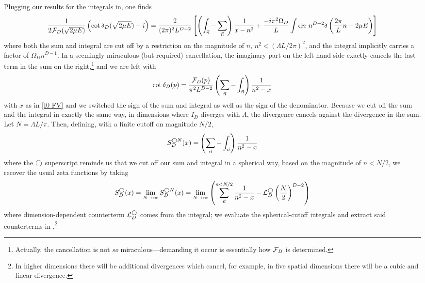 Plugging our results for the integrals in, one finds
\begin{equation}
    \frac{1}{2\mathcal{F}_{D}(\sqrt{2\mu E})}\left(\cot \delta_{D}(\sqrt{2\mu E}) - i\right) = \frac{2}{(2\pi)^2 L^{D-2}}\left[ \left(\int_{\vec{n}} - \sum_{\vec{n}}\right) \frac{1}{x-n^2} + \frac{-i \pi^2\Omega_D}{L} \int \mathrm{d}n\ n^{D-2} \delta\left(\frac{2\pi}{L}n - 2\mu E\right) \right]
\end{equation}
where both the sum and integral are cut off by a restriction on the magnitude of $n$, $n^2 < (\Lambda L / 2\pi)^2$, and the integral implicitly carries a factor of $\Omega_D n^{D-1}$.
In a seemingly miraculous (but required) cancellation, the imaginary part on the left hand side exactly cancels the last term in the sum on the right,\footnote{Actually, the cancellation is not \emph{so} miraculous---demanding it occur is essentially how $\mathcal{F}_D$ is determined.} and we are left with
\begin{equation}
    \cot \delta_{D}(p) = \frac{\mathcal{F}_{D}(p)}{\pi^2 L^{D-2}} \left(\sum_{\vec{n}}-\int_{\vec{n}}\right) \frac{1}{n^2-x}
\end{equation}
with $x$ as in \eqref{I0 FV} and we switched the sign of the sum and integral as well as the sign of the denominator.
Because we cut off the sum and the integral in exactly the same way, in dimensions where $I_D$ diverges with $\Lambda$, the divergence cancels against the divergence in the sum.
Let $N=\Lambda L/\pi$.
Then, defining, with a finite cutoff on magnitude $N/2$,
\begin{equation}\label{eq:spherical cutoff S}
    S^{\bigcirc N}_D(x) = \left(\sum_{\vec{n}}- \int_{\vec{n}}\right) \frac{1}{n^2-x}
\end{equation}
where the $\bigcirc$ superscript reminds us that we cut off our sum and integral in a spherical way, based on the magnitude of $n<N/2$, we recover the usual \Luscher zeta functions by taking
\begin{equation}\label{eq:spherical S}
    S^\bigcirc_D(x)
    =
    \lim_{N\rightarrow\infty} S^{\bigcirc N}_D(x)
    =
    \lim_{N\rightarrow\infty}\left( \sum_{\vec{n}}^{n < N/2} \frac{1}{n^2-x} - \mathcal{L}_D^\bigcirc \left(\frac{N}{2}\right)^{D-2}\right)
\end{equation}
where dimension-dependent counterterm $\mathcal{L}_D^\bigcirc$ comes from the integral; we evaluate the spherical-cutoff integrals and extract said counterterms in .\footnote{
In higher dimensions there will be additional divergences which cancel, for example, in five spatial dimensions there will be a cubic and linear divergence.
}
